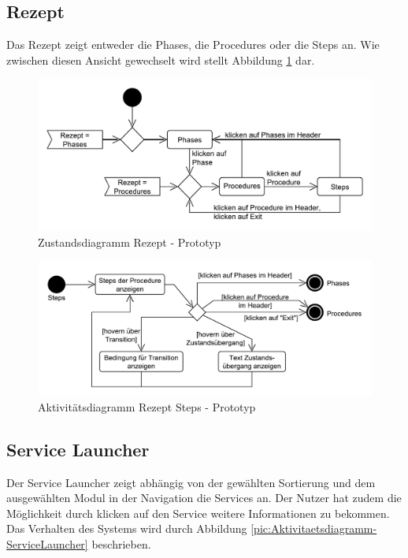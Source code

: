 \subsection{Rezept}
Das Rezept zeigt entweder die Phases, die Procedures oder die Steps an. Wie zwischen diesen Ansicht gewechselt wird stellt Abbildung \ref{pic:Zustandsdiagramm-Rezept} dar.
\begin{figure}[htbp]
\centering
\includegraphics[scale=0.6]{DA_files/UML/Prototyp/Zustandsdiagramm-Rezept.pdf}
\caption{Zustandsdiagramm Rezept - Prototyp}
\label{pic:Zustandsdiagramm-Rezept}
\end{figure}


\begin{figure}[htbp]
\centering
\includegraphics[scale=0.6]{DA_files/UML/Prototyp/Aktivitaetsdiagramm-Rezept-Steps.pdf}
\caption{Aktivitätsdiagramm Rezept Steps - Prototyp}
\label{pic:Aktivitaetsdiagramm-Rezept-Steps}
\end{figure}

\subsection{Service Launcher}
Der Service Launcher zeigt abhängig von der gewählten Sortierung und dem ausgewählten Modul in der Navigation die Services an. Der Nutzer hat zudem die Möglichkeit durch klicken auf den Service weitere Informationen zu bekommen. Das Verhalten des Systems wird durch Abbildung \ref{pic:Aktivitaetsdiagramm-ServiceLauncher} beschrieben.

